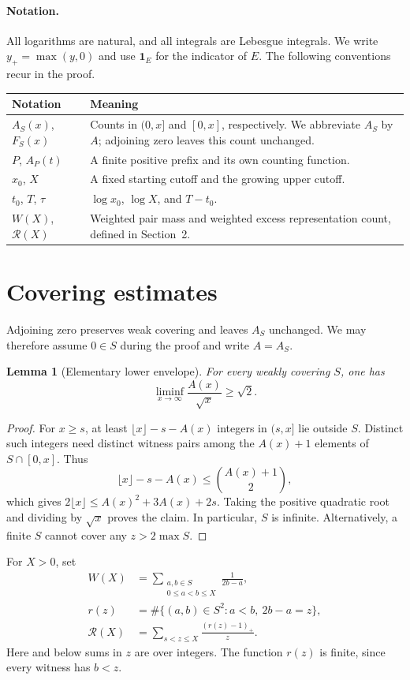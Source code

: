 \documentclass[11pt]{article}
\newtheorem{lemma}[theorem]{Lemma}
\theoremstyle{definition}\newtheorem{definition}[theorem]{Definition}
\theoremstyle{remark}\newtheorem{remark}[theorem]{Remark}
\numberwithin{equation}{section}
\newcommand{\RR}{\mathcal R}
\begin{document}
\paragraph{Notation.}
All logarithms are natural, and all integrals are Lebesgue integrals.
We write $y_+=\max(y,0)$ and use $\mathbf1_E$ for the indicator of $E$.
The following conventions recur in the proof.
\begin{center}\small
\begin{tabular}{@{}p{}p{}@{}}
\toprule
Notation & Meaning\\
\midrule
$A_S(x)$, $F_S(x)$ & Counts in $(0,x]$ and $[0,x]$, respectively. We abbreviate $A_S$ by $A$; adjoining zero leaves this count unchanged.\\
$P$, $A_P(t)$ & A finite positive prefix and its own counting function.\\
$x_0$, $X$ & A fixed starting cutoff and the growing upper cutoff.\\
$t_0$, $T$, $\tau$ & $\log x_0$, $\log X$, and $T-t_0$.\\
$W(X)$, $\RR(X)$ & Weighted pair mass and weighted excess representation count, defined in Section~2.\\
\bottomrule
\end{tabular}
\end{center}

\section{Covering estimates}
Adjoining zero preserves weak covering and leaves $A_S$ unchanged. We may therefore assume $0\in S$ during the proof and write $A=A_S$.

\begin{lemma}[Elementary lower envelope]\label{lem:lower}
For every weakly covering $S$, one has
\[
\liminf_{x\to\infty}\frac{A(x)}{\sqrt x}\ge\sqrt2.
\]
\end{lemma}
\begin{proof}
For $x\ge s$, at least $\lfloor x\rfloor-s-A(x)$ integers in $(s,x]$ lie outside $S$. Distinct such integers need distinct witness pairs among the $A(x)+1$ elements of $S\cap[0,x]$. Thus
\[
\lfloor x\rfloor-s-A(x)\le\binom{A(x)+1}{2},
\]
which gives $2\lfloor x\rfloor\le A(x)^2+3A(x)+2s$. Taking the positive quadratic root and dividing by $\sqrt x$ proves the claim. In particular, $S$ is infinite. Alternatively, a finite $S$ cannot cover any $z>2\max S$.
\end{proof}
For $X>0$, set
\begin{align}
W(X)&=\sum_{\substack{a,b\in S\\0\le a<b\le X}}\frac1{2b-a},\label{eq:W}\\
r(z)&=\#\{(a,b)\in S^2:a<b,\ 2b-a=z\},\nonumber\\
\RR(X)&=\sum_{s<z\le X}\frac{(r(z)-1)_+}{z}.\label{eq:R}
\end{align}
Here and below sums in $z$ are over integers. The function $r(z)$ is finite, since every witness has $b<z$.
\end{document}
